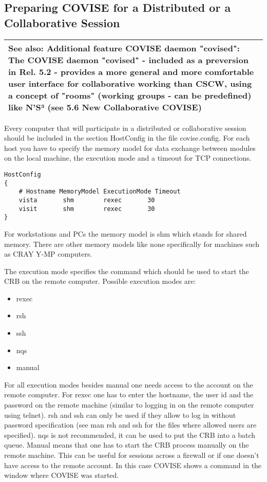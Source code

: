 %
\clearpage

\subsection{Preparing COVISE for a Distributed or a Collaborative Session}

\begin{longtable}{|p{14cm}|}
\hline
\newline
{\bf See also: Additional feature COVISE daemon "covised":}\newline
The COVISE daemon "covised" - included as a {\bf preversion} in Rel. 5.2 - 
provides a more general and more comfortable user interface for collaborative 
working than CSCW, using a concept of "rooms" (working groups - can be {\bf predefined}) 
like N'S³ (see {\bf 5.6 New Collaborative COVISE})\newline 
\\									
\hline
\end{longtable}

Every computer that will participate in a distributed or collaborative session should be included in the section
HostConfig in the file covise.config. For each host you have to specify the memory model for data exchange between
modules on the local machine, the execution mode and a timeout for TCP connections. 

\begin{verbatim}
HostConfig
{
    # Hostname MemoryModel ExecutionMode Timeout
    vista       shm        rexec       30
    visit       shm        rexec       30
}
\end{verbatim}

For workstations and PCs the memory model is shm which stands for shared memory. There 
are other memory models like none specifically for machines such as CRAY Y-MP computers.

The execution mode specifies the command which should be used to start the CRB on the remote computer. Possible
execution modes are:

\begin{itemize}
\item rexec
\item rsh
\item ssh
\item nqs
\item manual
\end{itemize}

For all execution modes besides manual one needs access to the account on the remote 
computer. For rexec one has to enter the hostname, the user id and the password on the 
remote machine (similar to logging in on the remote computer using telnet). rsh and ssh 
can only be used if they allow to log in without password specification (see man rsh and 
ssh for the files where allowed users are specified). nqs is not recommended, it can be 
used to put the CRB into a batch queue. Manual means that one has to start the CRB 
process manually on the remote machine. This can be useful for sessions across a 
firewall or if one doesn't have access to the remote account. In this case COVISE 
shows a command in the window where COVISE was started.

